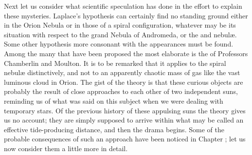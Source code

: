 Next let us consider what scientific speculation has done in the
effort to explain these mysteries. Laplace's hypothesis can certainly
find no standing ground either in the Orion Nebula or in those of a
spiral configuration, whatever may be its situation with respect to
the grand Nebula of Andromeda, or the  and
 nebul{\ae}. Some other hypothesis more consonant with
the appearances must be found. Among the many that have been proposed
the most elaborate is the  of
Professors Chamberlin and Moulton. It is to be remarked that it
applies to the spiral nebul{\ae} distinctively, and not to an
apparently chaotic mass of gas like the vast luminous cloud in
Orion. The gist of the theory is that these curious objects are
probably the result of close approaches to each other of two
independent suns, reminding us of what was said on this subject when
we were dealing with temporary stars. Of the previous history of these
appulsing suns the theory gives us no account; they are simply
supposed to arrive within what may be called an effective
tide-producing distance, and then the drama begins. Some of the
probable consequences of such an approach have been noticed in Chapter
{}; let us now consider them a little more in detail. 


